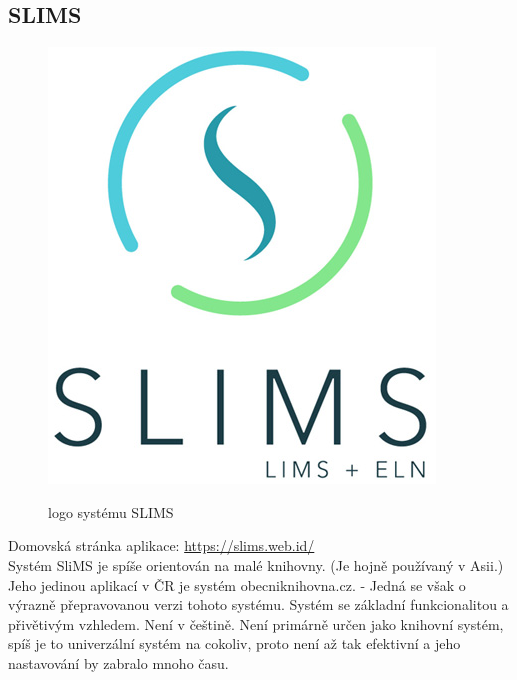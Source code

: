 \subsection{SLIMS}
\begin{figure}
	\includegraphics[width=\linewidth]{img/Slims_Logo.png}\\
	\caption[logo systému SLIMS ze stránky \url{https://slims.web.id/}]{logo systému SLIMS}
\end{figure}
Domovská stránka aplikace: \url{https://slims.web.id/}\\
Systém SliMS je spíše orientován na malé knihovny. (Je hojně používaný v Asii.)
Jeho jedinou aplikací v ČR je systém obecniknihovna.cz. - Jedná se však o
výrazně přepravovanou verzi tohoto systému.
Systém se základní funkcionalitou a přivětivým vzhledem.
Není v češtině. Není primárně určen jako knihovní systém, spíš je to univerzální
systém na cokoliv, proto není až tak efektivní a jeho nastavování
by zabralo mnoho času.


